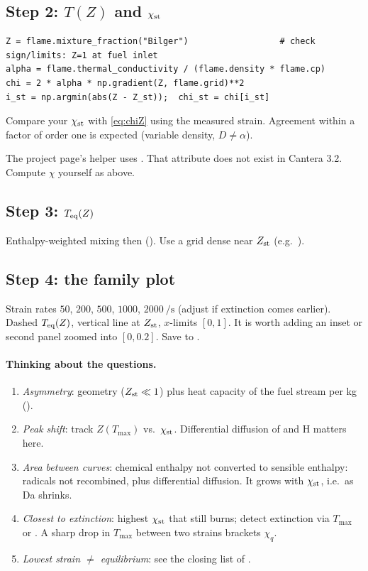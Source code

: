 \subsection*{Step 2: $T(Z)$ and $\chi_{\mathrm{st}}$}
\begin{lstlisting}
Z = flame.mixture_fraction("Bilger")                  # check sign/limits: Z=1 at fuel inlet
alpha = flame.thermal_conductivity / (flame.density * flame.cp)
chi = 2 * alpha * np.gradient(Z, flame.grid)**2
i_st = np.argmin(abs(Z - Z_st));  chi_st = chi[i_st]
\end{lstlisting}
Compare your $\chi_{\mathrm{st}}$ with \eqref{eq:chiZ} using the measured strain. Agreement within a factor of order one is
expected (variable density, $D\ne\alpha$).

\begin{warning}
The project page's helper uses . That attribute does not
exist in Cantera 3.2. Compute $\chi$ yourself as above.
\end{warning}

\subsection*{Step 3: $T_{\rm eq}(Z)$}
Enthalpy-weighted mixing then  (). Use a grid dense near $Z_{\mathrm{st}}$
(e.g.\ ).

\subsection*{Step 4: the family plot}
Strain rates $50$, $200$, $500$, $1000$, $2000~\si{\per\second}$ (adjust if extinction comes earlier). Dashed
$T_{\rm eq}(Z)$, vertical line at $Z_{\mathrm{st}}$, $x$-limits $[0,1]$. It is worth adding an inset or second panel zoomed into
$[0,0.2]$. Save to .

\paragraph{Thinking about the questions.}
\begin{enumerate}
  \item \emph{Asymmetry}: geometry ($Z_{\mathrm{st}}\ll1$) plus heat capacity of the fuel stream per kg
        ().
  \item \emph{Peak shift}: track $Z(T_{\max})$ vs.\ $\chi_{\mathrm{st}}$. Differential diffusion of  and H matters here.
  \item \emph{Area between curves}: chemical enthalpy not converted to sensible enthalpy: radicals not
        recombined, plus differential diffusion. It grows with $\chi_{\mathrm{st}}$, i.e.\ as Da shrinks.
  \item \emph{Closest to extinction}: highest $\chi_{\mathrm{st}}$ that still burns; detect extinction via $T_{\max}$ or
        . A sharp drop in $T_{\max}$ between two strains brackets $\chi_q$.
  \item \emph{Lowest strain $\ne$ equilibrium}: see the closing list of .
\end{enumerate}

